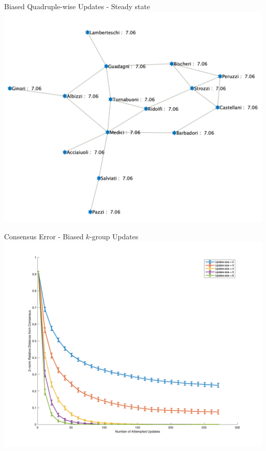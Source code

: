 \documentclass[usenames,dvipsnames,10pt]{beamer}
\theoremstyle{remark}
\begin{document}
\begin{frame}{\small Biased Quadruple-wise Updates - Steady state}
\centering
    \includegraphics[scale=.18]{../Figures/introP48.png}
\end{frame}

\begin{frame}{Consensus Error - Biased $k$-group Updates}
\centering
    \includegraphics[scale=.175]{../Figures/errorBars.png}
\end{frame}

\end{document}
